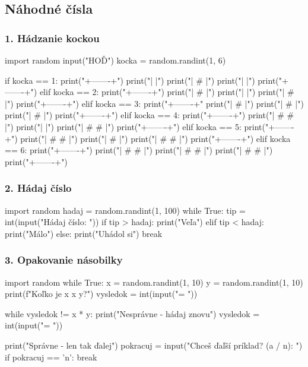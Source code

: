 \subsection{Náhodné čísla}
\subsubsection*{1. Hádzanie kockou}

\begin{solution}
import random
input("HOĎ")
kocka = random.randint(1, 6)

if kocka == 1:
	print("+-------+")
	print("|       |")
    print("|   #   |")
	print("|       |")
	print("+-------+")
elif kocka == 2:
	print("+-------+")
    print("| #     |")
    print("|       |")
    print("|     # |")
    print("+-------+")
elif kocka == 3:
	print("+-------+"
	print("| #     |")
	print("|   #   |")
	print("|     # |")
	print("+-------+")
elif kocka == 4:
	print("+-------+")
	print("| #   # |")
	print("|       |")
	print("| #   # |")
	print("+-------+")
elif kocka == 5:
	print("+-------+")
	print("| #   # |")
	print("|   #   |")
	print("| #   # |")
	print("+-------+")
elif kocka == 6:
	print("+-------+")
	print("| #   # |")
	print("| #   # |")
	print("| #   # |")
	print("+-------+")
\end{solution}

\subsubsection*{2. Hádaj číslo}
\begin{solution}
import random
hadaj = random.randint(1, 100)
while True:
	tip = int(input("Hádaj číslo: "))
	if tip > hadaj:
		print("Veľa")
	elif tip < hadaj:
        print("Málo")
    else:
        print("Uhádol si")
        break
\end{solution}


\subsubsection*{3. Opakovanie násobilky}
\begin{solution}
import random
while True:
    x = random.randint(1, 10)
    y = random.randint(1, 10)
    print(f"Koľko je {x} x {y}?")
    vysledok = int(input("= "))

    while vysledok != x * y:
        print("Nesprávne - hádaj znovu")
        vysledok = int(input("= "))

    print("Správne - len tak ďalej")
    pokracuj = input("Chceš ďaľší príklad? (a / n): ")
    if pokracuj == 'n':
        break
\end{solution}
